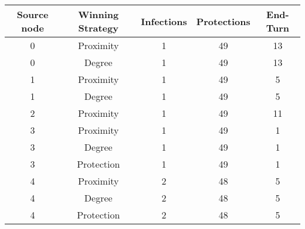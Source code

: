 \documentclass[results.tex]{subfiles}
\begin{document}
    \begin{center}
        \begin{tabular}{| c || c | c | c | c |}
            \hline
            {\bfseries Source node} & {\bfseries Winning Strategy} & {\bfseries Infections} & {\bfseries Protections}
            & {\bfseries End-Turn}
            \\  %
            \hline\hline
            0                       & Proximity                    & 1                      & 49                      & 13                   \\
            \hline
            0                       & Degree                       & 1                      & 49                      & 13                   \\
            \hline
            1                       & Proximity                    & 1                      & 49                      & 5                    \\
            \hline
            1                       & Degree                       & 1                      & 49                      & 5                    \\
            \hline
            2                       & Proximity                    & 1                      & 49                      & 11                   \\
            \hline
            3                       & Proximity                    & 1                      & 49                      & 1                    \\
            \hline
            3                       & Degree                       & 1                      & 49                      & 1                    \\
            \hline
            3                       & Protection                   & 1                      & 49                      & 1                    \\
            \hline
            4                       & Proximity                    & 2                      & 48                      & 5                    \\
            \hline
            4                       & Degree                       & 2                      & 48                      & 5                    \\
            \hline
            4                       & Protection                   & 2                      & 48                      & 5                    \\

\end{tabular}
\end{center}
\end{document}
